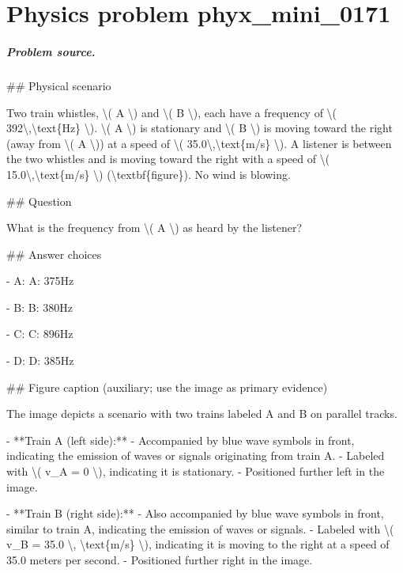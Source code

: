 
\chapter{Physics problem phyx\_mini\_0171}
\label{ch:PhyXMiniProblems_problem_phyx_mini_0171}

\paragraph{Problem source.}
\#\# Physical scenario

Two train whistles, \textbackslash{}( A \textbackslash{}) and \textbackslash{}( B \textbackslash{}), each have a frequency of \textbackslash{}( 392\textbackslash{},\textbackslash{}text\{Hz\} \textbackslash{}). \textbackslash{}( A \textbackslash{}) is stationary and \textbackslash{}( B \textbackslash{}) is moving toward the right (away from \textbackslash{}( A \textbackslash{})) at a speed of \textbackslash{}( 35.0\textbackslash{},\textbackslash{}text\{m/s\} \textbackslash{}). A listener is between the two whistles and is moving toward the right with a speed of \textbackslash{}( 15.0\textbackslash{},\textbackslash{}text\{m/s\} \textbackslash{}) (\textbackslash{}textbf\{figure\}). No wind is blowing.

\#\# Question

What is the frequency from \textbackslash{}( A \textbackslash{}) as heard by the listener?

\#\# Answer choices

- A: A: 375Hz

- B: B: 380Hz

- C: C: 896Hz

- D: D: 385Hz

\#\# Figure caption (auxiliary; use the image as primary evidence)

The image depicts a scenario with two trains labeled A and B on parallel tracks. 

- **Train A (left side):**
  - Accompanied by blue wave symbols in front, indicating the emission of waves or signals originating from train A.
  - Labeled with \textbackslash{}( v\_A = 0 \textbackslash{}), indicating it is stationary.
  - Positioned further left in the image.

- **Train B (right side):**
  - Also accompanied by blue wave symbols in front, similar to train A, indicating the emission of waves or signals.
  - Labeled with \textbackslash{}( v\_B = 35.0 \textbackslash{}, \textbackslash{}text\{m/s\} \textbackslash{}), indicating it is moving to the right at a speed of 35.0 meters per second.
  - Positioned further right in the image.

